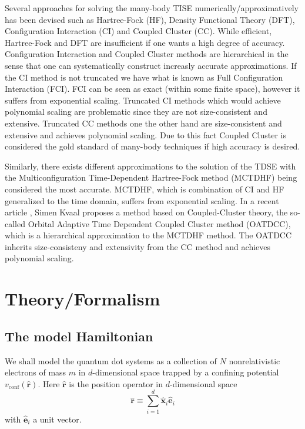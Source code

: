 \documentclass[a4paper,10pt, twocolumn]{article}
\begin{document}
Several approaches for solving the many-body TISE numerically/approximatively has been devised such as Hartree-Fock (HF), Density Functional Theory (DFT), 
Configuration Interaction (CI) and Coupled Cluster (CC). While efficient, Hartree-Fock and DFT 
are insufficient if one wants a high degree of accuracy. Configuration Interaction and Coupled Cluster methods are hierarchical in the sense that one can 
systematically construct increasly accurate approximations. If the CI method is not truncated we have what is known as Full Configuration Interaction (FCI). FCI 
can be seen as exact (within some finite space), however it suffers from exponential scaling. Truncated CI methods which would achieve polynomial scaling 
are problematic since they are not size-consistent and extensive. Truncated CC methods one the other hand are size-consistent and extensive and achieves polynomial 
scaling. Due to this fact Coupled Cluster is considered the gold standard of many-body techniques if high accuracy is desired. 

Similarly, there exists different approximations to the solution of the TDSE with 
the Multiconfiguration Time-Dependent Hartree-Fock method (MCTDHF) being considered the most accurate. MCTDHF, which is combination of CI and HF generalized to 
the time domain, suffers from exponential scaling. In a recent article \cite{Kvaal12}, Simen Kvaal proposes a method based on Coupled-Cluster theory, 
the so-called Orbital Adaptive Time Dependent Coupled Cluster method (OATDCC), which is a hierarchical approximation to the MCTDHF method. The OATDCC inherits 
size-consisteny and extensivity from the CC method and achieves polynomial scaling. 
\section{Theory/Formalism}
\subsection{The model Hamiltonian}
We shall model the quantum dot systems as a collection of $N$ nonrelativistic electrons of mass $m$ in $d$-dimensional space trapped by a confining potential 
$v_{\text{conf}}(\mathbf{\hat{r}})$. Here $\hat{\mathbf{r}}$ is the position operator in $d$-dimensional space 
\begin{equation}
 \hat{\mathbf{r}} \equiv \sum_{i=1}^d \hat{\mathbf{x}}_i \hat{\mathbf{e}}_i
\end{equation}
with $\hat{\mathbf{e}}_i$ a unit vector.
\end{document}
